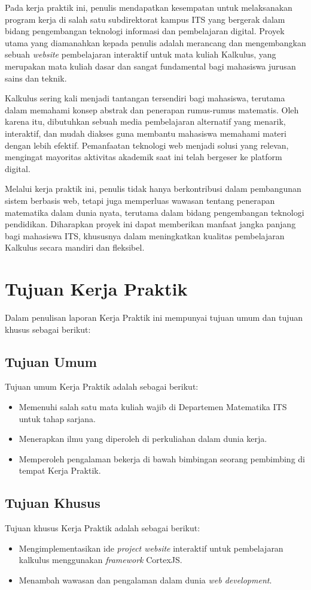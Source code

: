 \documentclass{file/KP-ITS}
\theoremstyle{definition}
\theoremstyle{definition}
\theoremstyle{plain}
\begin{document}
Pada kerja praktik ini, penulis mendapatkan kesempatan untuk melaksanakan program kerja di salah satu subdirektorat kampus ITS yang bergerak dalam bidang pengembangan teknologi informasi dan pembelajaran digital. Proyek utama yang diamanahkan kepada penulis adalah merancang dan mengembangkan sebuah \textit{website} pembelajaran interaktif untuk mata kuliah Kalkulus, yang merupakan mata kuliah dasar dan sangat fundamental bagi mahasiswa jurusan sains dan teknik.

Kalkulus sering kali menjadi tantangan tersendiri bagi mahasiswa, terutama dalam memahami konsep abstrak dan penerapan rumus-rumus matematis. Oleh karena itu, dibutuhkan sebuah media pembelajaran alternatif yang menarik, interaktif, dan mudah diakses guna membantu mahasiswa memahami materi dengan lebih efektif. Pemanfaatan teknologi web menjadi solusi yang relevan, mengingat mayoritas aktivitas akademik saat ini telah bergeser ke platform digital.

Melalui kerja praktik ini, penulis tidak hanya berkontribusi dalam pembangunan sistem berbasis web, tetapi juga memperluas wawasan tentang penerapan matematika dalam dunia nyata, terutama dalam bidang pengembangan teknologi pendidikan. Diharapkan proyek ini dapat memberikan manfaat jangka panjang bagi mahasiswa ITS, khususnya dalam meningkatkan kualitas pembelajaran Kalkulus secara mandiri dan fleksibel.

\section{Tujuan Kerja Praktik}
Dalam penulisan laporan Kerja Praktik ini mempunyai tujuan umum dan tujuan khusus sebagai berikut:
\subsection{Tujuan Umum}
Tujuan umum Kerja Praktik adalah sebagai berikut:
\begin{itemize}
    \item Memenuhi salah satu mata kuliah wajib di Departemen Matematika ITS untuk tahap sarjana.
    \item Menerapkan ilmu yang diperoleh di perkuliahan dalam dunia kerja.
    \item Memperoleh pengalaman bekerja di bawah bimbingan seorang pembimbing di tempat Kerja Praktik.
\end{itemize}

\subsection{Tujuan Khusus}
Tujuan khusus Kerja Praktik adalah sebagai berikut:
\begin{itemize}
    \item Mengimplementasikan ide \textit{project website} interaktif untuk pembelajaran kalkulus menggunakan \textit{framework} CortexJS.
    \item Menambah wawasan dan pengalaman dalam dunia \textit{web development}.
\end{itemize}
\end{document}
